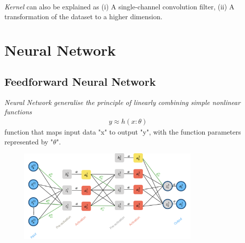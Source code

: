 \documentclass[a4paper,10pt]{article}
\begin{document}
\textit{Kernel} can also be explained as (i) A single-channel convolution filter, (ii) A transformation of the dataset to a higher dimension.




\section{Neural Network}
\subsection{Feedforward Neural Network}
\textit{Neural Network generalise the principle of linearly combining simple nonlinear functions}
\begin{gather*}
    y\approx h(x:\theta)
\end{gather*}
function that maps input data "x" to output "y", with the function parameters represented by "$\theta$".

\begin{figure}[ht]
    \centering
    \includegraphics[width =0.8\textwidth]{FNN.png}
\end{figure}
\end{document}
